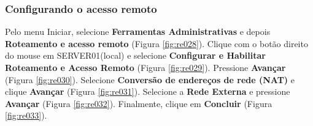 \documentclass[10pt]{article}
\begin{document}
\subsubsection{Configurando o acesso remoto}
Pelo menu Iniciar, selecione \textbf{Ferramentas Administrativas} e depois \textbf{Roteamento e acesso remoto} (Figura \ref{fig:re028}). Clique com o botão direito do mouse em SERVER01(local) e selecione \textbf{Configurar e Habilitar Roteamento e Acesso Remoto} (Figura \ref{fig:re029}). Pressione \textbf{Avançar} (Figura \ref{fig:re030}). Selecione \textbf{Conversão de endereços de rede (NAT)} e clique \textbf{Avançar} (Figura \ref{fig:re031}). Selecione a \textbf{Rede Externa} e pressione \textbf{Avançar} (Figura \ref{fig:re032}). Finalmente, clique em \textbf{Concluir} (Figura \ref{fig:re033}).
\end{document}
